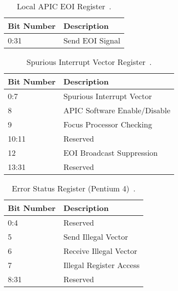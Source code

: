 \begin{table}[H]
  \centering
  \begin{tabularx}{1.0\textwidth}{| X | X |}
    \hline
    \textbf{Bit Number} & \textbf{Description} \\ \hline\hline
    0:31                & Send EOI Signal      \\ \hline
  \end{tabularx}
  \caption{Local APIC EOI Register~\cite[sec.~3.11.8.5]{ia32}.}
  \label{tab:lapicregseoi}
\end{table}

\begin{table}[H]
  \centering
  \begin{tabularx}{1.0\textwidth}{| X | X |}
    \hline
    \textbf{Bit Number} & \textbf{Description}         \\ \hline\hline
    0:7                 & Spurious Interrupt Vector    \\ \hline
    8                   & APIC Software Enable/Disable \\ \hline
    9                   & Focus Processor Checking     \\ \hline
    10:11               & Reserved                     \\ \hline
    12                  & EOI Broadcast Suppression    \\ \hline
    13:31               & Reserved                     \\ \hline
  \end{tabularx}
  \caption{Spurious Interrupt Vector Register~\cite[sec.~3.11.9]{ia32}.}
  \label{tab:lapicregssvr}
\end{table}

\begin{table}[H]
  \centering
  \begin{tabularx}{1.0\textwidth}{| X | X |}
    \hline
    \textbf{Bit Number} & \textbf{Description}    \\ \hline\hline
    0:4                 & Reserved                \\ \hline
    5                   & Send Illegal Vector     \\ \hline
    6                   & Receive Illegal Vector  \\ \hline
    7                   & Illegal Register Access \\ \hline
    8:31                & Reserved                \\ \hline
  \end{tabularx}
  \caption{Error Status Register (Pentium 4)~\cite[sec.~3.11.5.3]{ia32}.}
  \label{tab:lapicregsesr}
\end{table}

